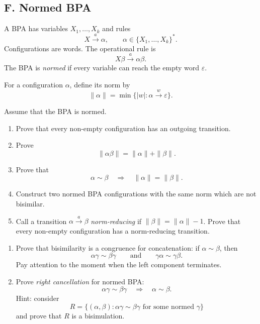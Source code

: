 \documentclass[11pt,a4paper,lmodern]{tutorial}
\newcommand{\ew}{\ensuremath{\varepsilon}}
\newcommand{\trans}[1]{\xrightarrow{#1}}
\begin{document}
\begin{unfinished}
\section*{F. Normed BPA}

A BPA has variables $X_1,\ldots,X_k$ and rules
\[
      X\trans{a}\alpha,
      \qquad \alpha\in\{X_1,\ldots,X_k\}^*.
\]
Configurations are words. The operational rule is
\[
      X\beta\trans{a}\alpha\beta.
\]
The BPA is \emph{normed} if every variable can reach the empty word
$\ew$.

For a configuration $\alpha$, define its norm by
\[
   \|\alpha\|
   =
   \min\{|w|:\alpha\trans{w}\ew\}.
\]

\begin{exercise}
Assume that the BPA is normed.

\begin{enumerate}[label=(\alph*)]
\item Prove that every non-empty configuration has an outgoing transition.
\item Prove
      \[
          \|\alpha\beta\|
          =
          \|\alpha\|+\|\beta\|.
      \]
\item Prove that
      \[
          \alpha\sim\beta
          \quad\Longrightarrow\quad
          \|\alpha\|=\|\beta\|.
      \]
\item Construct two normed BPA configurations with the same norm which are
      not bisimilar.
\item Call a transition $\alpha\trans{a}\beta$ \emph{norm-reducing} if
      $\|\beta\|=\|\alpha\|-1$. Prove that every non-empty configuration
      has a norm-reducing transition.
\end{enumerate}
\end{exercise}

\begin{exercise}
\begin{enumerate}[label=(\alph*)]
\item Prove that bisimilarity is a congruence for concatenation:
      if $\alpha\sim\beta$, then
      \[
          \alpha\gamma\sim\beta\gamma
          \qquad\text{and}\qquad
          \gamma\alpha\sim\gamma\beta.
      \]
      Pay attention to the moment when the left component terminates.

\item Prove \emph{right cancellation} for normed BPA:
      \[
          \alpha\gamma\sim\beta\gamma
          \quad\Longrightarrow\quad
          \alpha\sim\beta.
      \]
      Hint: consider
      \[
          R=\{(\alpha,\beta):
          \alpha\gamma\sim\beta\gamma
          \text{ for some normed }\gamma\}
      \]
      and prove that $R$ is a bisimulation.


\end{enumerate}
\end{exercise}
\end{unfinished}
\end{document}
